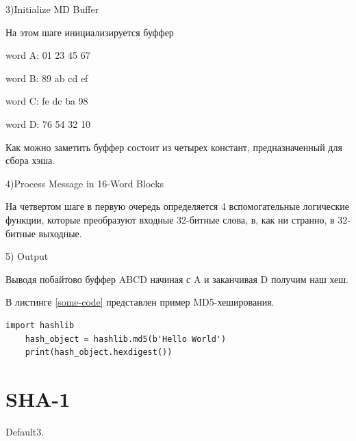 \documentclass[a4paper, 12pt, oneside]{scrartcl}
\begin{document}
    3)Initialize MD Buffer\par
    На этом шаге инициализируется буффер\par
    word A: 01 23 45 67\par
    word B: 89 ab cd ef\par
    word C: fe dc ba 98\par
    word D: 76 54 32 10\par
    Как можно заметить буффер состоит из четырех констант, предназначенный для сбора хэша.\par
    4)Process Message in 16-Word Blocks\par
    На четвертом шаге в первую очередь определяется 4 вспомогательные логические функции, которые преобразуют входные 32-битные слова, в, как ни странно, в 32-битные выходные.\par

    5) Output\par
    Выводя побайтово буффер ABCD начиная с A и заканчивая D получим наш хеш.\par
    В листинге \ref{some-code} представлен пример MD5-хеширования.\par

\begin{lstlisting}[label=some-code,caption= MD5]
    import hashlib
    hash_object = hashlib.md5(b'Hello World')
    print(hash_object.hexdigest())
\end{lstlisting}
    \section{SHA-1}\label{sec:section3}
    Default3.
    
    
\end{document}

